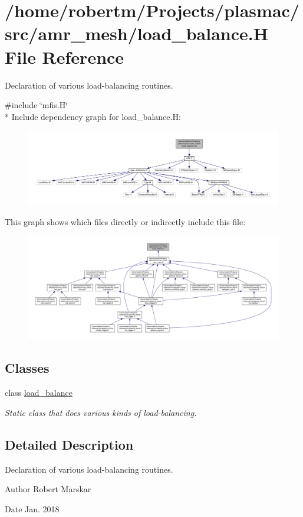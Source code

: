 \hypertarget{load__balance_8H}{}\section{/home/robertm/\+Projects/plasmac/src/amr\+\_\+mesh/load\+\_\+balance.H File Reference}
\label{load__balance_8H}


Declaration of various load-\/balancing routines.  


{\ttfamily \#include \char`\"{}mfis.\+H\char`\"{}}\\*
Include dependency graph for load\+\_\+balance.\+H\+:\nopagebreak
\begin{figure}[H]
\begin{center}
\leavevmode
\includegraphics[width=350pt]{load__balance_8H__incl}
\end{center}
\end{figure}
This graph shows which files directly or indirectly include this file\+:\nopagebreak
\begin{figure}[H]
\begin{center}
\leavevmode
\includegraphics[width=350pt]{load__balance_8H__dep__incl}
\end{center}
\end{figure}
\subsection*{Classes}
\begin{DoxyCompactItemize}
\item 
class \hyperlink{classload__balance}{load\+\_\+balance}
\begin{DoxyCompactList}\small\item\em Static class that does various kinds of load-\/balancing. \end{DoxyCompactList}\end{DoxyCompactItemize}


\subsection{Detailed Description}
Declaration of various load-\/balancing routines. 

\begin{DoxyAuthor}{Author}
Robert Marskar 
\end{DoxyAuthor}
\begin{DoxyDate}{Date}
Jan. 2018 
\end{DoxyDate}
